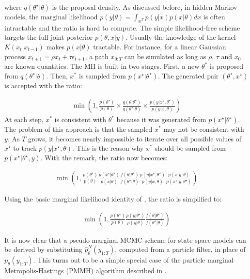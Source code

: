 \documentclass[11pt,a4,twosided,singlespacing,titlepagenumber=on]{scrreprt}
\numberwithin{equation}{chapter} %
\theoremstyle{remark}
\begin{document}
where $q(\theta^\star|\theta)$ is the proposal density. As discussed before, in hidden Markov models, the marginal likelihood $p(y|\theta) = \int_{\mathbb{R}^T} p(y|x)p(x|\theta) dx$ is often intractable and the ratio is hard to compute. The simple likelihood-free scheme targets the full joint posterior $p(\theta,x|y)$. Usually the knowledge of the kernel $K(x_t|x_{t-1})$ makes $p(x|\theta)$ tractable. For instance, for a linear Gaussian process $x_{t+1} = \rho x_t + \tau \epsilon_{t+1}$, a path $x_{0:T}$ can be simulated as long as $\rho$, $\tau$ and $x_0$ are known quantities. The MH is built in two stages. First, a new $\theta^*$ is proposed from $q(\theta^\star|\theta)$. Then, $x^*$ is sampled from $p(x^\star|\theta^\star)$. The generated pair $(\theta^\star,x^\star)$ is accepted with the ratio:

\begin{align*}
\min \left( 1, \frac{p(\theta^\star)}{p(\theta)} \times  \frac{q(\theta|\theta^\star)}{q(\theta^\star|\theta)} \times \frac{p(y|{x}^\star,\theta^\star)}{p(y|{x},\theta)} \right)
\end{align*}
At each step, $x^*$ is consistent with $\theta^*$ because it was generated from $p(x^\star|\theta^\star)$. The problem of this approach is that the sampled $x^*$ may not be consistent with $y$. As $T$ grows, it becomes nearly impossible to iterate over all possible values of $x^\star$ to track $p(y|x^\star,\theta)$. This is the reason why $x^*$ should be sampled from $p(x^\star|\theta^\star,y)$. With the remark, the ratio now becomes:

\begin{align*}
 \min \left(1, \frac{p(\theta^\star)}{p(\theta)}   \frac{p({x}^\star|\theta^\star)}{p({x}|\theta)}   \frac{f(\theta|\theta^\star)}{f(\theta^\star|\theta)}   \frac{p(y|{x}^\star,\theta^\star)}{p(y|{x},\theta)}  \frac{p({x}|y,\theta)}{p({x}^\star|y,\theta^\star)} \right)
\end{align*}

Using the basic marginal likelihood identity of \cite{chib1995}, the ratio is simplified to:

\begin{align*}
 \min \left(1, \frac{p(\theta^\star)}{p(\theta)}  \frac{p(y|\theta^\star)}{p(y|\theta)} \frac{f(\theta|\theta^\star)}{f(\theta^\star|\theta)} \right)
\end{align*}

It is now clear that a pseudo-marginal MCMC scheme for state space models can be derived by substituting $\hat{p}^N_{\theta}(y_{1:T})$, computed from a particle filter, in place of $p_{\theta}(y_{1:T})$. This turns out to be a simple special case of the particle marginal Metropolis-Hastings (PMMH) algorithm described in \cite{andrieu2010}.
\end{document}
